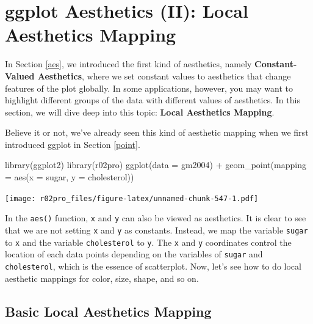 \documentclass[
]{book}
\newenvironment{Shaded}{\begin{snugshade}}{\end{snugshade}}
\newcommand{\AttributeTok}[1]{\textcolor[rgb]{0.77,0.63,0.00}{#1}}
\newcommand{\FunctionTok}[1]{\textcolor[rgb]{0.00,0.00,0.00}{#1}}
\newcommand{\NormalTok}[1]{#1}
\newcommand{\SpecialCharTok}[1]{\textcolor[rgb]{0.00,0.00,0.00}{#1}}
\begin{document}
\hypertarget{aes-map}{%
\section{ggplot Aesthetics (II): Local Aesthetics Mapping}\label{aes-map}}

In Section \ref{aes}, we introduced the first kind of aesthetics, namely \textbf{Constant-Valued Aesthetics}, where we set constant values to aesthetics that change features of the plot globally. In some applications, however, you may want to highlight different groups of the data with different values of aesthetics. In this section, we will dive deep into this topic: \textbf{Local Aesthetics Mapping}.

Believe it or not, we've already seen this kind of aesthetic mapping when we first introduced ggplot in Section \ref{point}.

\begin{Shaded}
\begin{Highlighting}[]
\FunctionTok{library}\NormalTok{(ggplot2)}
\FunctionTok{library}\NormalTok{(r02pro)}
\FunctionTok{ggplot}\NormalTok{(}\AttributeTok{data =}\NormalTok{ gm2004) }\SpecialCharTok{+} 
  \FunctionTok{geom\_point}\NormalTok{(}\AttributeTok{mapping =} \FunctionTok{aes}\NormalTok{(}\AttributeTok{x =}\NormalTok{ sugar, }
                           \AttributeTok{y =}\NormalTok{ cholesterol))}
\end{Highlighting}
\end{Shaded}

\texttt{[image: r02pro\_files/figure-latex/unnamed-chunk-547-1.pdf]}

In the \texttt{aes()} function, \texttt{x} and \texttt{y} can also be viewed as aesthetics. It is clear to see that we are not setting \texttt{x} and \texttt{y} as constants. Instead, we map the variable \texttt{sugar} to \texttt{x} and the variable \texttt{cholesterol} to \texttt{y}. The \texttt{x} and \texttt{y} coordinates control the location of each data points depending on the variables of \texttt{sugar} and \texttt{cholesterol}, which is the essence of scatterplot. Now, let's see how to do local aesthetic mappings for color, size, shape, and so on.

\hypertarget{basic-local-aesthetics-mapping}{%
\subsection{Basic Local Aesthetics Mapping}\label{basic-local-aesthetics-mapping}}
\end{document}
